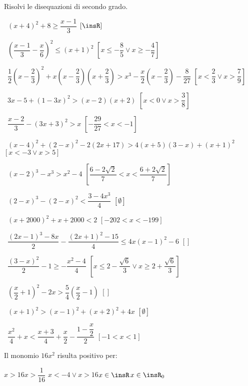 \begin{esercizio}[\Ast]
\label{ese:4.20}
Risolvi le disequazioni di secondo grado.
\vspace{\dy}
 \begin{enumeratea}
 \item~\((x+4)^2+8\ge \dfrac{x-1} 3\)
  \hfill \(\left[\insR\right]\)
 \item~\(\left(\dfrac{x-1} 3-\dfrac x 6\right)^2\le (x+1)^2\)
  \hfill \(\left[x\le -\dfrac 8 5\vee x\ge -\dfrac 4 7\right]\)
 \item~\(\dfrac 1 2\left(x-\dfrac 2 3\right)^2+x\left(x-\dfrac 2 3\right)
  \left(x+\dfrac 2 3\right)>x^3-\dfrac x 2\left(x-\dfrac 2 3\right)-\dfrac 
8{27}\)
  \hfill \(\left[x<\dfrac 2 3\vee x>\dfrac 7 9\right]\)
 \item~\(3x-5+(1-3x)^2>(x-2)(x+2)\)
  \hfill \(\left[x<0\vee x>\dfrac 3 8\right]\)
 \item~\(\dfrac{x-2} 3-(3x+3)^2>x\)
  \hfill \(\left[-\dfrac{29}{27}<x<-1\right]\)
 \item~\((x-4)^2+(2-x)^2-2(2x+17)>4(x+5)(3-x)+(x+1)^2\)
  \hfill \(\left[x<-3\vee x>5\right]\)
 \item~\((x-2)^3-x^3>x^2-4\)
  \hfill \(\left[\dfrac{6-2\sqrt 2} 7<x<\dfrac{6+2\sqrt 2} 7\right]\)
 \item~\((2-x)^3-(2-x)^2<\dfrac{3-4x^3} 4\)
  \hfill \(\left[\emptyset\right]\)
 \item~\((x+2000)^2+x+2000<2\)
  \hfill \(\left[-202<x<-199\right]\)
 \item~\(\dfrac{\left(2x-1\right)^3-8x} 2-\dfrac{\left(2x+1\right)^2-15} 4\le 
 4x\left(x-1\right)^2-6\)
  \hfill \(\left[\right]\)
 \item~\(\dfrac{(3-x)^2} 2-1\ge -\dfrac{x^2-4} 4\) 
  \hfill \(\left[x\le 2-\dfrac{\sqrt 6} 3\vee x\ge 2+\dfrac{\sqrt 6} 
3\right]\)
 \item~\(\left(\dfrac x 2+1\right)^2-2x>\dfrac 5 4\left(\dfrac x 2-1\right)\)
  \hfill \(\left[\right]\)
 \item~\((x+1)^2>(x-1)^2+(x+2)^2+4x\)
  \hfill \(\left[\emptyset \right]\)
 \item~\(\dfrac{x^2} 4+x<\dfrac{x+3} 4+\dfrac x 2-\dfrac{1-\dfrac x 2} 2\)
  \hfill \(\left[-1<x<1\right]\)
 \end{enumeratea}
\end{esercizio}

\begin{esercizio}
\label{ese:4.23}
Il monomio \(16x^2\) risulta positivo per:

\boxA\quad \(x>16\)\qquad \boxB\quad \(x>\dfrac 1{16}\)\qquad\boxC\quad 
\(x<-4\vee 
x>16\)\qquad\boxD\quad \(x\in \insR\)\qquad\boxE\quad \(x\in \insR_0\)

\end{esercizio}

